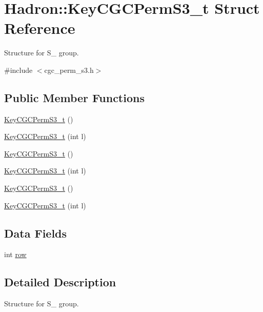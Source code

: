 \hypertarget{structHadron_1_1KeyCGCPermS3__t}{}\section{Hadron\+:\+:Key\+C\+G\+C\+Perm\+S3\+\_\+t Struct Reference}
\label{structHadron_1_1KeyCGCPermS3__t}


Structure for S\+\_ group.  




{\ttfamily \#include $<$cgc\+\_\+perm\+\_\+s3.\+h$>$}

\subsection*{Public Member Functions}
\begin{DoxyCompactItemize}
\item 
\mbox{\hyperlink{structHadron_1_1KeyCGCPermS3__t_a7d9a9f27c0bc478ff41dbdc47deee19e}{Key\+C\+G\+C\+Perm\+S3\+\_\+t}} ()
\item 
\mbox{\hyperlink{structHadron_1_1KeyCGCPermS3__t_af58d8b287b6da4b7998735e67be0f1f9}{Key\+C\+G\+C\+Perm\+S3\+\_\+t}} (int l)
\item 
\mbox{\hyperlink{structHadron_1_1KeyCGCPermS3__t_a7d9a9f27c0bc478ff41dbdc47deee19e}{Key\+C\+G\+C\+Perm\+S3\+\_\+t}} ()
\item 
\mbox{\hyperlink{structHadron_1_1KeyCGCPermS3__t_af58d8b287b6da4b7998735e67be0f1f9}{Key\+C\+G\+C\+Perm\+S3\+\_\+t}} (int l)
\item 
\mbox{\hyperlink{structHadron_1_1KeyCGCPermS3__t_a7d9a9f27c0bc478ff41dbdc47deee19e}{Key\+C\+G\+C\+Perm\+S3\+\_\+t}} ()
\item 
\mbox{\hyperlink{structHadron_1_1KeyCGCPermS3__t_af58d8b287b6da4b7998735e67be0f1f9}{Key\+C\+G\+C\+Perm\+S3\+\_\+t}} (int l)
\end{DoxyCompactItemize}
\subsection*{Data Fields}
\begin{DoxyCompactItemize}
\item 
int \mbox{\hyperlink{structHadron_1_1KeyCGCPermS3__t_ae42674e0246b466965e187a7210cd8e2}{row}}
\end{DoxyCompactItemize}


\subsection{Detailed Description}
Structure for S\+\_ group. 

